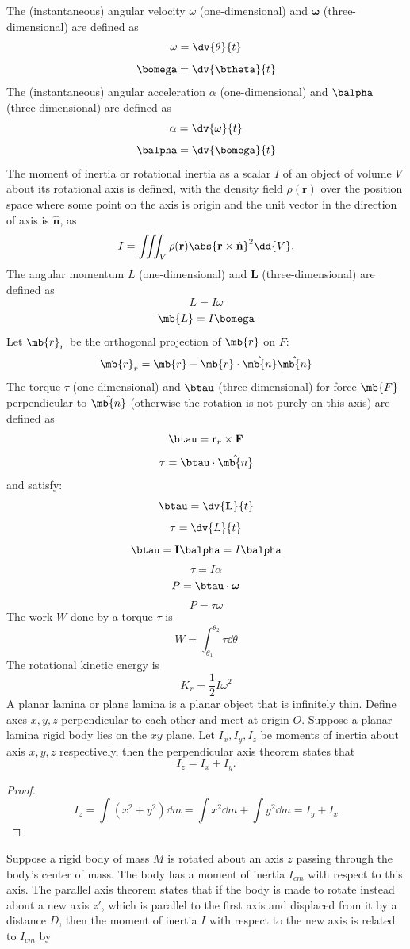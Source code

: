 \documentclass[a4paper,12pt]{article}
\begin{document}
The (instantaneous) angular velocity $\omega$ (one-dimensional) and $\boldsymbol{\omega}$ (three-dimensional) are defined as
\[\omega=\dv{\theta}{t}\]
\[\bomega=\dv{\btheta}{t}\]
The (instantaneous) angular acceleration $\alpha$ (one-dimensional) and $\balpha$ (three-dimensional) are defined as
\[\alpha=\dv{\omega}{t}\]
\[\balpha=\dv{\bomega}{t}\]
The moment of inertia or rotational inertia as a scalar $I$ of an object of volume $V$ about its rotational axis is defined, with the density field $\rho(\mathbf{r})$ over the position space where some point on the axis is origin and the unit vector in the direction of axis is $\hat{\mathbf{n}}$, as
\[I=\iiint_V\rho(\mathbf{r})\abs{\mathbf{r}\times\hat{\mathbf{n}}}^2\dd{V}.\]
The angular momentum $L$ (one-dimensional) and $\mathbf{L}$ (three-dimensional) are defined as
\[L=I\omega\]
\[\mb{L}=I\bomega\]
Let $\mb{r}_r$ be the orthogonal projection of $\mb{r}$ on $F$:
\[\mb{r}_r=\mb{r}-\mb{r}\cdot\hat{\mb{n}}\hat{\mb{n}}\]
The torque $\tau$ (one-dimensional) and $\btau$ (three-dimensional) for force $\mb{F}$ perpendicular to $\hat{\mb{n}}$ (otherwise the rotation is not purely on this axis) are defined as
\[\btau=\mathbf{r}_r\times\mathbf{F}\]
\[\tau=\btau\cdot\hat{\mb{n}}\]
and satisfy:
\[\btau=\dv{\mathbf{L}}{t}\]
\[\tau=\dv{L}{t}\]
\[\btau=\mathbf{I}\balpha=I\balpha\]
\[\tau=I\alpha\]
\[P=\btau\cdot\boldsymbol{\omega}\]
\[P=\tau\omega\]
The work $W$ done by a torque $\tau$ is
\[W=\int_{\theta_1}^{\theta_2}\tau\dd{\theta}\]
The rotational kinetic energy is
\[K_r=\frac{1}{2}I\omega^2\]
A planar lamina or plane lamina is a planar object that is infinitely thin.
Define axes $x,y,z$ perpendicular to each other and meet at origin $O$. Suppose a planar lamina rigid body lies on the $xy$ plane. Let $I_x,I_y,I_z$ be moments of inertia about axis $x,y,z$ respectively, then the perpendicular axis theorem states that
\[I_z=I_x+I_y.\]
\begin{proof}
\[I_z=\int(x^2+y^2)\dd{m}=\int x^2\dd{m}+\int y^2\dd{m}=I_y+I_x\]
\end{proof}
Suppose a rigid body of mass $M$ is rotated about an axis $z$ passing through the body's center of mass. The body has a moment of inertia $I_{cm}$ with respect to this axis. The parallel axis theorem states that if the body is made to rotate instead about a new axis $z'$, which is parallel to the first axis and displaced from it by a distance $D$, then the moment of inertia $I$ with respect to the new axis is related to $I_{cm}$ by
\end{document}
